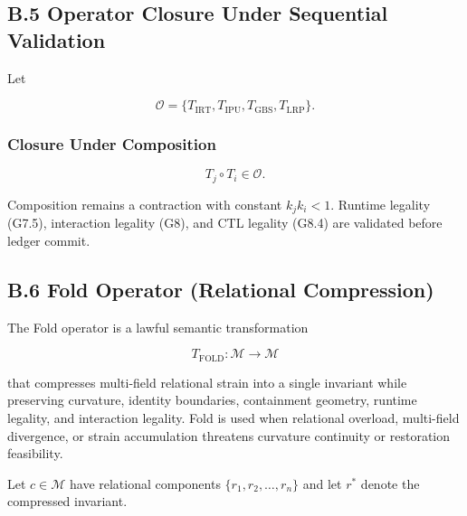 
\subsection*{B.5 Operator Closure Under Sequential Validation}

Let



\[
\mathcal{O} =
\{T_{\mathrm{IRT}}, T_{\mathrm{IPU}}, T_{\mathrm{GBS}}, T_{\mathrm{LRP}}\}.
\]



\subsubsection*{Closure Under Composition}



\[
T_j \circ T_i \in \mathcal{O}.
\]



\noindent Composition remains a contraction with constant $k_j k_i < 1$.
Runtime legality (G7.5), interaction legality (G8), and CTL legality (G8.4) are
validated before ledger commit.


\subsection*{B.6 Fold Operator (Relational Compression)}

\noindent The Fold operator is a lawful semantic transformation



\[
T_{\mathrm{FOLD}} : \mathcal{M} \rightarrow \mathcal{M}
\]



that compresses multi-field relational strain into a single invariant while
preserving curvature, identity boundaries, containment geometry, runtime
legality, and interaction legality. Fold is used when relational overload,
multi-field divergence, or strain accumulation threatens curvature continuity or
restoration feasibility.

\medskip

\noindent Let $c \in \mathcal{M}$ have relational components
$\{r_1, r_2, \dots, r_n\}$ and let $r^*$ denote the compressed invariant.



